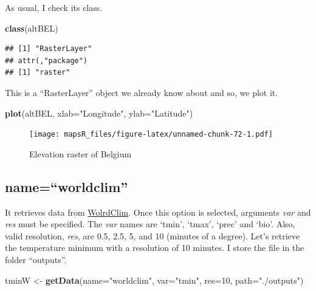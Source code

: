 \documentclass[]{report}
\newenvironment{Shaded}{\begin{snugshade}}{\end{snugshade}}
\newcommand{\KeywordTok}[1]{\textcolor[rgb]{0.13,0.29,0.53}{\textbf{{#1}}}}
\newcommand{\DataTypeTok}[1]{\textcolor[rgb]{0.13,0.29,0.53}{{#1}}}
\newcommand{\DecValTok}[1]{\textcolor[rgb]{0.00,0.00,0.81}{{#1}}}
\newcommand{\StringTok}[1]{\textcolor[rgb]{0.31,0.60,0.02}{{#1}}}
\newcommand{\NormalTok}[1]{{#1}}
\begin{document}
As usual, I check its class.

\begin{Shaded}
\begin{Highlighting}[]
\KeywordTok{class}\NormalTok{(altBEL)}
\end{Highlighting}
\end{Shaded}

\begin{verbatim}
## [1] "RasterLayer"
## attr(,"package")
## [1] "raster"
\end{verbatim}

This is a ``RasterLayer'' object we already know about and so, we plot
it.

\begin{Shaded}
\begin{Highlighting}[]
\KeywordTok{plot}\NormalTok{(altBEL, }\DataTypeTok{xlab=}\StringTok{"Longitude"}\NormalTok{, }\DataTypeTok{ylab=}\StringTok{"Latitude"}\NormalTok{)}
\end{Highlighting}
\end{Shaded}

\begin{figure}[htbp]
\centering
\texttt{[image: mapsR\_files/figure-latex/unnamed-chunk-72-1.pdf]}
\caption{Elevation raster of Belgium}
\end{figure}

\subsection{\texorpdfstring{name=``worldclim''}{name=worldclim}}\label{nameworldclim}

It retrieves data from \href{http://worldclim.org}{WolrdClim}. Once this
option is selected, arguments \emph{var} and \emph{res} must be
specified. The \emph{var} names are `tmin', `tmax', `prec' and `bio'.
Also, valid resolution, \emph{res}, are 0.5, 2.5, 5, and 10 (minutes of
a degree). Let's retrieve the temperature minimum with a resolution of
10 minutes. I store the file in the folder ``outputs''.

\begin{Shaded}
\begin{Highlighting}[]
\NormalTok{tminW <-}\StringTok{ }\KeywordTok{getData}\NormalTok{(}\DataTypeTok{name=}\StringTok{"worldclim"}\NormalTok{, }\DataTypeTok{var=}\StringTok{"tmin"}\NormalTok{, }\DataTypeTok{res=}\DecValTok{10}\NormalTok{, }\DataTypeTok{path=}\StringTok{"./outputs"}\NormalTok{)}
\end{Highlighting}
\end{Shaded}
\end{document}
